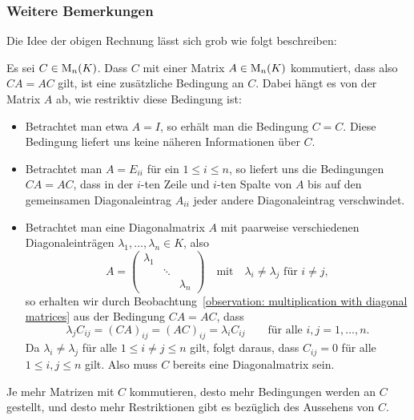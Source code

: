 


\subsubsection{Weitere Bemerkungen}

\begin{remark}
  Die Idee der obigen Rechnung lässt sich grob wie folgt beschreiben:
  
  Es sei $C \in \operatorname{M}_{n}(K)$.
  Dass $C$ mit einer Matrix $A \in \operatorname{M}_{n}(K)$ kommutiert, dass also $CA = AC$ gilt, ist eine zusätzliche Bedingung an $C$.
  Dabei hängt es von der Matrix $A$ ab, wie restriktiv diese Bedingung ist:
  \begin{itemize}
    \item
      Betrachtet man etwa $A = I$, so erhält man die Bedingung $C = C$.
      Diese Bedingung liefert uns keine näheren Informationen über $C$.
    \item
      Betrachtet man $A = E_{ii}$ für ein $1 \leq i \leq n$, so liefert uns die Bedingungen $CA = AC$, dass in der $i$-ten Zeile und $i$-ten Spalte von $A$ bis auf den gemeinsamen Diagonaleintrag $A_{ii}$ jeder andere Diagonaleintrag verschwindet.
    \item
      Betrachtet man eine Diagonalmatrix $A$ mit paarweise verschiedenen Diagonaleinträgen $\lambda_1, \dotsc, \lambda_n \in K$, also
      \[
          A
        = \begin{pmatrix}
            \lambda_1 &         &           \\
                      & \ddots  &           \\
                      &         & \lambda_n
          \end{pmatrix}
          \quad\text{mit}\quad
          \text{$\lambda_i \neq \lambda_j$ für $i \neq j$},
      \]
      so erhalten wir durch Beobachtung~\ref{observation: multiplication with diagonal matrices} aus der Bedingung $CA = AC$, dass
      \[
          \lambda_j C_{ij}
        = (CA)_{ij}
        = (AC)_{ij}
        = \lambda_i C_{ij}
        \qquad
        \text{für alle $i, j = 1, \dotsc, n$}.
      \]
      Da $\lambda_i \neq \lambda_j$ für alle $1 \leq i \neq j \leq n$ gilt, folgt daraus, dass $C_{ij} = 0$ für alle $1 \leq i,j \leq n$ gilt.
      Also muss $C$ bereits eine Diagonalmatrix sein.
  \end{itemize}
  Je mehr Matrizen mit $C$ kommutieren, desto mehr Bedingungen werden an $C$ gestellt, und desto mehr Restriktionen gibt es bezüglich des Aussehens von $C$.
  

\end{remark}
